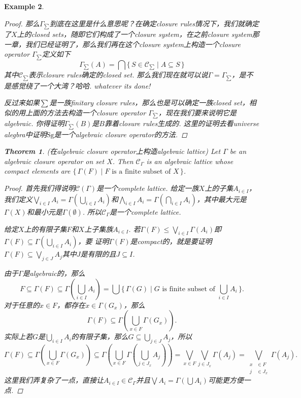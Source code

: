 \documentclass{article}
\newtheorem{theorem}{Theorem}[section]
\newtheorem{example}[theorem]{Example}
\newcommand\Set[2]{\{\,#1\mid#2\,\}} %
\newcommand\SET[2]{\Set{#1}{\text{#2}}} %
\begin{document}
\begin{example}
\begin{proof}
那么$\Gamma_{\sum}$到底在这里是什么意思呢？在确定closure rules情况下，我们就确定了$X$上的closed sets，随即它们构成了一个closure system，在之前closure system那一章，我们已经证明了，那么我们再在这个closure system上构造一个closure operator $\Gamma_{\sum}$定义如下
$$
\Gamma_{\sum}(A) = \bigcap \Set{S \in \mathcal{C}_{\sum}}{ A \subseteq S}
$$
其中$\mathcal{C}_{\sum}$表示closure rules确定的closed set. 那么我们现在就可以说$\Gamma = \Gamma_{\sum}$，是不是感觉绕了一个大湾？哈哈. whatever its done!

反过来如果$\sum$是一族finitary closure rules，那么也是可以确定一族closed set，相似的用上面的方法去构造一个closure operator $\Gamma_{\sum}$，现在我们要来说明它是algebraic. 你得证明$\Gamma_{\sum}(B)$是$B$靠着closure rules生成的. 这里的证明去看universe alegbra中证明$\text{Sg}$是一个algebraic closure operator的方法.
\end{proof}

\newpage
\begin{theorem}
\rm {\color{red} (在algebraic closure operator上构造algebraic lattice)} Let $\Gamma$ be an algebraic closure operator on set $X$. Then $\mathcal{C}_\Gamma$ is an algebraic lattice whose compact elements are $\SET{\Gamma(F)}{$F$ is a finite subset of $X$}$.
\end{theorem}

\begin{proof}
首先我们得说明$\mathcal{C}(\Gamma)$是一个complete lattice. 给定一族$X$上的子集$A_{i \in I}$，我们定义$\bigvee\limits_{i \in I} A_i = \Gamma(\bigcup\limits_{i \in I} A_i)$和$\bigwedge_{i \in I} A_i = \Gamma(\bigcap_{i \in I} A_i)$，其中最大元是$\Gamma(X)$和最小元是$\Gamma(\emptyset)$. 所以$\mathcal{C}_{\Gamma}$是一个complete lattice.


给定$X$上的有限子集$F$和$X$上子集族$A_{i \in I}$. 若$\Gamma(F) \leq \bigvee\limits_{i\in I}\Gamma(A_i)$即$\Gamma(F) \subseteq \Gamma(\bigcup\limits_{i\in I} A_i)$，要{\color{red} 证明$\Gamma(F)$是compact的，就是要证明$\Gamma(F) \subseteq \bigvee\limits_{j \in J} A_j$其中$J$是有限的且$J \subseteq I$}.

由于$\Gamma$是algebraic的，那么
$$
F \subseteq \Gamma(F) \subseteq \Gamma(\bigcup\limits_{i\in I} A_i) = \bigcup\SET{\Gamma(G)}{$G$ is finite subset of $\bigcup\limits_{i\in I} A_i$}.
$$
对于任意的$x \in F$，都存在$x \in \Gamma(G_x)$，那么
$$
\Gamma(F) \subseteq \Gamma(\bigcup\limits_{x \in F}\Gamma(G_x)).
$$
实际上若$G$是$\bigcup\limits_{i\in I} A_i$的有限子集，那么$G \subseteq \bigcup\limits_{j\in J} A_j$，所以
$$
\Gamma(F) \subseteq \Gamma(\bigcup\limits_{x \in F}\Gamma(G_x)) \subseteq \Gamma(\bigcup\limits_{x \in F} \Gamma(\bigcup\limits_{j\in J_x} A_j)) = \bigvee\limits_{x \in F} \bigvee\limits_{j\in J_x} \Gamma(A_j) = \bigvee\limits_{\begin{aligned} x &\in F \\ j &\in J_x \end{aligned}} \Gamma(A_j).
$$
这里我们弄复杂了一点，直接让$A_{i \in I} \in \mathcal{C}_\Gamma$并且$\bigvee A_i = \Gamma(\bigcup A_i)$可能更方便一点.


\end{proof}
\end{example}
\end{document}
